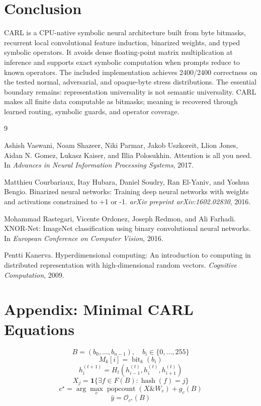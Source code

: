 \documentclass[10pt]{article}
\newcommand{\CARL}{\textsc{CARL}}
\newcommand{\popcount}{\operatorname{popcount}}
\begin{document}
\section{Conclusion}

\CARL{} is a CPU-native symbolic neural architecture built from byte bitmasks, recurrent local convolutional feature induction, binarized weights, and typed symbolic operators. It avoids dense floating-point matrix multiplication at inference and supports exact symbolic computation when prompts reduce to known operators. The included implementation achieves 2400/2400 correctness on the tested normal, adversarial, and opaque-byte stress distributions. The essential boundary remains: representation universality is not semantic universality. \CARL{} makes all finite data computable as bitmasks; meaning is recovered through learned routing, symbolic guards, and operator coverage.

\begin{thebibliography}{9}

Ashish Vaswani, Noam Shazeer, Niki Parmar, Jakob Uszkoreit, Llion Jones, Aidan N. Gomez, Lukasz Kaiser, and Illia Polosukhin.
\newblock Attention is all you need.
\newblock In \emph{Advances in Neural Information Processing Systems}, 2017.

Matthieu Courbariaux, Itay Hubara, Daniel Soudry, Ran El-Yaniv, and Yoshua Bengio.
\newblock Binarized neural networks: Training deep neural networks with weights and activations constrained to +1 or -1.
\newblock \emph{arXiv preprint arXiv:1602.02830}, 2016.

Mohammad Rastegari, Vicente Ordonez, Joseph Redmon, and Ali Farhadi.
\newblock XNOR-Net: ImageNet classification using binary convolutional neural networks.
\newblock In \emph{European Conference on Computer Vision}, 2016.

Pentti Kanerva.
\newblock Hyperdimensional computing: An introduction to computing in distributed representation with high-dimensional random vectors.
\newblock \emph{Cognitive Computation}, 2009.

\end{thebibliography}

\appendix

\section{Appendix: Minimal CARL Equations}

\[
B=(b_0,\ldots,b_{n-1}), \quad b_i \in \{0,\ldots,255\}
\]
\[
M_k[i]=\operatorname{bit}_k(b_i)
\]
\[
h_i^{(t+1)} = H_t(h_{i-1}^{(t)},h_i^{(t)},h_{i+1}^{(t)})
\]
\[
X_j = \mathbf{1}\{\exists f \in F(B): \operatorname{hash}(f)=j\}
\]
\[
c^\star = \arg\max_c \popcount(X \& W_c) + g_c(B)
\]
\[
\hat{y}=\mathcal{O}_{c^\star}(B)
\]
\end{document}
